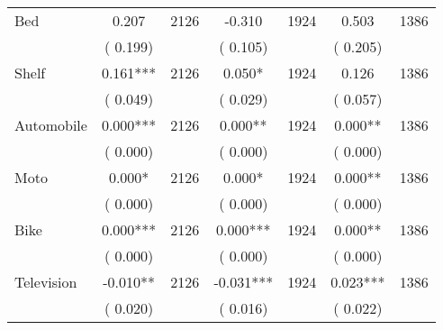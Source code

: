 \begin{tabular}{l*{6}{c}}
Bed        &              0.207      &       2126       &             -0.310      &       1924       &              0.503      &       1386       \\
                       &       (       0.199)            &                               &       (       0.105)            &                               &       (       0.205)            &                               \\
Shelf        &              0.161***      &       2126       &              0.050*      &       1924       &              0.126      &       1386       \\
                       &       (       0.049)            &                               &       (       0.029)            &                               &       (       0.057)            &                               \\
Automobile        &              0.000***      &       2126       &              0.000**      &       1924       &              0.000**      &       1386       \\
                       &       (       0.000)            &                               &       (       0.000)            &                               &       (       0.000)            &                               \\
Moto        &              0.000*      &       2126       &              0.000*      &       1924       &              0.000**      &       1386       \\
                       &       (       0.000)            &                               &       (       0.000)            &                               &       (       0.000)            &                               \\
Bike        &              0.000***      &       2126       &              0.000***      &       1924       &              0.000**      &       1386       \\
                       &       (       0.000)            &                               &       (       0.000)            &                               &       (       0.000)            &                               \\
Television        &             -0.010**      &       2126       &             -0.031***      &       1924       &              0.023***      &       1386       \\
                       &       (       0.020)            &                               &       (       0.016)            &                               &       (       0.022)            &                               \\

\end{tabular}
